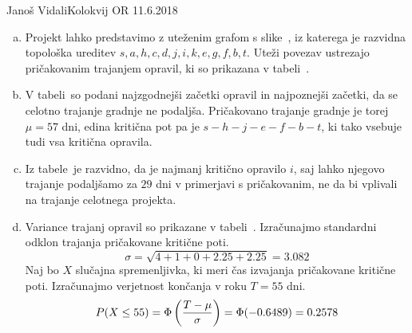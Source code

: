 \begin{naloga}{Janoš Vidali}{Kolokvij OR 11.6.2018}
\begin{odgovor}
\begin{enumerate}[(a)]
\item Projekt lahko predstavimo z uteženim grafom s slike~\fig,
iz katerega je raz\-vid\-na topološka ureditev
$s, a, h, c, d, j, i, k, e, g, f, b, t$.
Uteži povezav ustrezajo pričakovanim trajanjem opravil,
ki so prikazana v tabeli~.

\item V tabeli~
so podani najzgodnejši začetki opravil in najpoznejši začetki,
da se celotno trajanje gradnje ne podaljša.
Pričakovano trajanje gradnje je torej $\mu = 57$ dni,
edina kritična pot pa je $s - h - j - e - f - b - t$,
ki tako vsebuje tudi vsa kritična opravila.

\item Iz tabele~ je razvidno,
da je najmanj kritično opravilo $i$,
saj lahko njegovo trajanje
podaljšamo za $29$ dni v primerjavi s pričakovanim,
ne da bi vplivali na trajanje celotnega projekta.

\item Variance trajanj opravil so prikazane v tabeli~.
Izračunajmo standardni odklon trajanja pričakovane kritične poti.
$$
\sigma = \sqrt{4 + 1 + 0 + 2.25 + 2.25} = 3.082
$$
Naj bo $X$ slučajna spremenljivka,
ki meri čas izvajanja pričakovane kritične poti.
Izračunajmo verjetnost končanja v roku $T = 55$ dni.
$$
P(X \le 55) = \Phi\left({T - \mu \over \sigma}\right) = \Phi(-0.6489) = 0.2578
$$
\end{enumerate}
%
\begin{slika}
\makebox[\textwidth][c]{
\pgfslika
}
\end{slika}
%
\begin{tabela}
\end{tabela}

\end{odgovor}
\end{naloga}